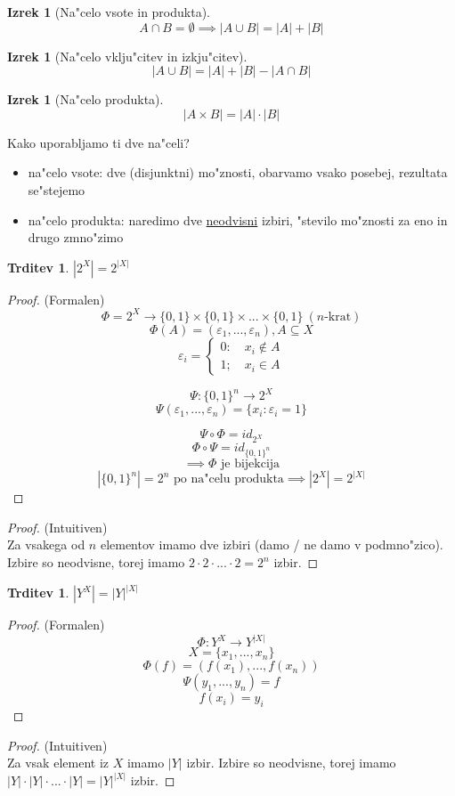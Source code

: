 \documentclass[a4paper,12pt]{article}
\theoremstyle{definition}
\newtheorem{claim}[counter]{Trditev}
\newtheorem{theorem}[counter]{Izrek}
\theoremstyle{remark}
\begin{document}
\begin{theorem}[Na"celo vsote in produkta]
	\[
	A \cap B = \emptyset \implies |A \cup B| = |A| + |B|
	\]	
\end{theorem}

\begin{theorem}[Na"celo vklju"citev in izkju"citev]
	\[
	|A \cup B| = |A| + |B| - |A \cap B|
	\]	
\end{theorem}


\begin{theorem}[Na"celo produkta]
	\[
	|A\times B| = |A|\cdot|B|
	\]
\end{theorem}

Kako uporabljamo ti dve na"celi?
\begin{itemize}
	\item na"celo vsote: dve (disjunktni) mo"znosti, obarvamo vsako posebej, rezultata se"stejemo
	\item na"celo produkta: naredimo dve \underline{neodvisni} izbiri, "stevilo mo"znosti za eno in drugo zmno"zimo
\end{itemize}

\begin{claim}
	$|2^X| = 2^{|X|}$
\end{claim}


\begin{proof}
	(Formalen)
	\[\Phi = 2^X \rightarrow \{0, 1\}\times\{0, 1\}\times...\times\{0, 1\} \ (n\text{-krat})\]
	\[\Phi(A) = (\varepsilon_1, ..., \varepsilon_n), A \subseteq X\]
	\[\varepsilon_i = \begin{cases}0: \quad x_i \notin A  \\ 1; \quad x_i \in A \end{cases}\]
	
	
	\[
	\Psi : \{0, 1\}^n \rightarrow 2^X
	\]
	\[
	\Psi (\varepsilon_1, ..., \varepsilon_n) = \{x_i : \varepsilon_i = 1\}
	\]
	
	
	\[\Psi \circ \Phi = id_{2^X}\]
	\[\Phi \circ \Psi = id_{\{0, 1\}^n}\]
	\[\implies \Phi \text{ je bijekcija}\]
	\[|\{0, 1\}^n| = 2^n \text{ po na"celu produkta}\implies |2^X| = 2^{|X|}\]
\end{proof}
\begin{proof}
	(Intuitiven)\\
	Za vsakega od $n$ elementov imamo dve izbiri (damo / ne damo v podmno"zico). 
	Izbire so neodvisne, torej imamo
	$2 \cdot 2 \cdot ...\cdot 2 = 2^n$
	izbir.
\end{proof}

\begin{claim}
	$|Y^X| = |Y|^{|X|}$
\end{claim}
\begin{proof}(Formalen)
	\[\Phi : Y^X \rightarrow Y^{|X|}\]
	\[X = \{x_1, ..., x_n\}\]
	\[\Phi (f) = (f(x_1), ..., f(x_n))\]
	\[\Psi (y_1, ..., y_n) = f\]
	\[f(x_i) = y_i\]
\end{proof}
\begin{proof}(Intuitiven)\\
	Za vsak element iz $X$ imamo $|Y|$ izbir. Izbire so neodvisne, torej imamo $|Y|\cdot|Y|\cdot ... \cdot|Y| = |Y|^{|X|}$ izbir.
\end{proof}
\end{document}
